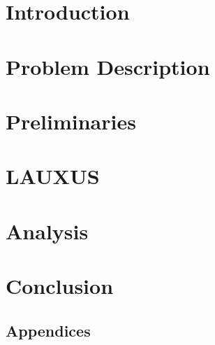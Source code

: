 \documentclass[main.tex]{subfiles}
\begin{document}


\chapter{Introduction}
\label{chapter:introduction}



\chapter{Problem Description}
\label{chapter:problem}






\chapter{Preliminaries}
\label{chapter:theoric}





\chapter{LAUXUS}
\label{chapter:lauxus}










\chapter{Analysis}
\label{chapter:analysis}






\chapter{Conclusion}
\label{chapter:conclusion}



\nocite{*}




\appendix
\section*{Appendices}
\renewcommand{\thesection}{\Alph{section}}

\end{document}
